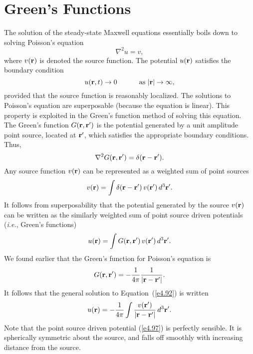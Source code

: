 \section{Green's Functions}
The solution of the steady-state Maxwell equations essentially
boils down to solving
 Poisson's equation
\begin{equation}\label{e4.92}
\nabla^2 u = v,
\end{equation}
where $v({\bf r})$ is denoted the source function. The potential $u({\bf r})$ 
satisfies the boundary condition 
\begin{equation}
u({\bf r},t) \rightarrow 0 \mbox{\hspace{1cm} as $|{\bf r}|\rightarrow\infty$},
\end{equation}
provided  that the source function 
 is reasonably localized. The solutions to Poisson's equation
are superposable (because the equation is linear). This property  is exploited in the Green's
function method of solving this equation. The Green's function $G({\bf r}, {\bf r}')$ is the 
potential
generated by a unit amplitude
point source, located at ${\bf r}'$, which satisfies the appropriate boundary conditions.
Thus,
\begin{equation}\label{e4.94}
\nabla^2 G({\bf r}, {\bf r}') = \delta({\bf r} - {\bf r}').
\end{equation}
Any source function $v({\bf r})$ can be represented as a weighted sum of point
sources
\begin{equation}
v({\bf r}) = \int \delta({\bf r} - {\bf r}')\, v({\bf r}') \,d^3{\bf r}'.
\end{equation}
It follows from superposability that the potential generated by the source $v({\bf r})$
can be written as the similarly weighted sum of point source driven
potentials ({\em i.e.}, Green's functions)
\begin{equation}\label{e4.96}
u({\bf r} ) = \int G({\bf r}, {\bf r}')\, v({\bf r}') \, d^3{\bf r}'.
\end{equation}
We found earlier that the Green's function for Poisson's equation is
\begin{equation}\label{e4.97}
G({\bf r}, {\bf r}') = - \frac{1}{4\pi} \frac{1}{|{\bf r} - {\bf r}'|}.
\end{equation}
It follows that the general solution to Equation~(\ref{e4.92}) is written
\begin{equation}
u({\bf r}) = -\frac{1}{4\pi} \int \frac{v({\bf r}')}{|{\bf r} - {\bf r}'|}\,d^3{\bf r}'.
\end{equation}
Note that the point source driven potential (\ref{e4.97}) is perfectly sensible. It is spherically symmetric
about the source, and  falls off smoothly with increasing distance from the source. 

